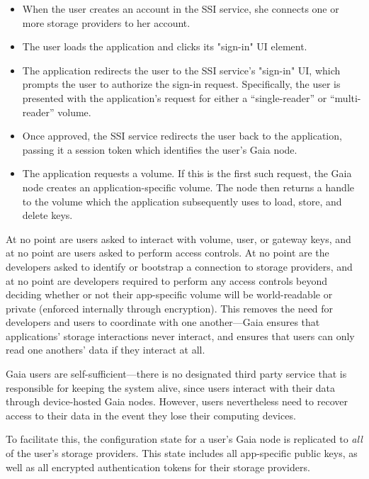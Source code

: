 \begin{itemize}
   \item When the user creates an account in the SSI service, she connects one
      or more storage providers to her account.
   \item The user loads the application and clicks its "sign-in" UI element.
   \item The application redirects the user to the SSI service's "sign-in" UI,
      which prompts the user to authorize the sign-in request.  Specifically,
      the user is presented with the application's request for either a
      ``single-reader'' or ``multi-reader'' volume.
   \item Once approved, the SSI service redirects the user back to the
      application, passing it a session token which identifies the user's Gaia
      node.
   \item The application requests a volume.  If this is the first such request,
      the Gaia node creates an application-specific volume.  The node then
      returns a handle to the volume which the application subsequently uses to
      load, store, and delete keys.
\end{itemize}

At no point are users asked to interact with volume, user, or gateway keys, and at no point
are users asked to perform access controls.  At no point are the developers
asked to identify or bootstrap a connection to storage providers, and at no
point are developers required to perform any access controls beyond deciding
whether or not their app-specific volume will be world-readable or private
(enforced internally through encryption).  This removes the need for developers
and users to coordinate with one another---Gaia ensures that applications' storage
interactions never interact, and ensures that users can only read one anothers'
data if they interact at all.

Gaia users are self-sufficient---there is no designated third party service that is
responsible for keeping the system alive, since users interact with their data
through device-hosted Gaia nodes.  However, users nevertheless need to recover
access to their data in the event they lose their computing devices.

To facilitate this, the configuration state for a user's Gaia node is replicated to \textit{all} of
the user's storage providers.  This state includes all app-specific public keys,
as well as all encrypted authentication tokens for their storage providers.

